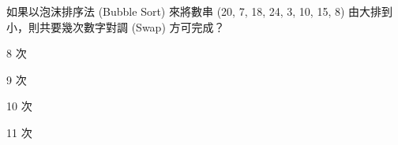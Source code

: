 \ifx\ntpcNinetyTwo\undefined[92學年基北區] \fi
如果以泡沫排序法 (Bubble Sort) 來將數串 (20, 7, 18, 24, 3, 10, 15, 8) 由大排到小，則共要幾次數字對調 (Swap) 方可完成？
  \begin{optionlist}
  \item 8 次
  \item 9 次
  \item 10 次
  \item 11 次\label{ntpc-92-a5}
  \end{optionlist}